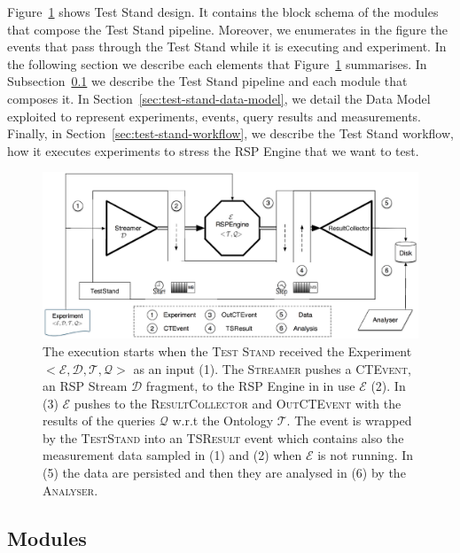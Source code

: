 Figure~\ref{fig:architecture} shows \name Test Stand design. It contains the block schema of the modules that compose the Test Stand pipeline. Moreover, we enumerates in the figure the events that pass through the Test Stand while it is executing and experiment. In the following section we describe each elements that Figure~\ref{fig:architecture} summarises. In Subsection~\ref{sec:modules} we describe the Test Stand pipeline and each module that composes it. In Section~\ref{sec:test-stand-data-model}, we detail the Data Model exploited to represent experiments, events, query results and measurements. Finally, in Section~\ref{sec:test-stand-workflow}, we describe the Test Stand workflow, how it executes experiments to stress the RSP Engine that we want to test.

\begin{figure}[tbh]
\centering
\includegraphics[scale=0.37]{images/heaven-schema-workflow}
\caption[\name Modules and Workflow]{The execution starts when the \textsc{Test Stand} received the Experiment $<\mathcal{E},\mathcal{D},\mathcal{T},\mathcal{Q}>$ as an input (1). The \textsc{Streamer} pushes a \textsc{CTEvent}, an RSP Stream $\mathcal{D}$ fragment, to the RSP Engine in in use $\mathcal{E}$ (2). In (3) $\mathcal{E}$ pushes to the \textsc{ResultCollector} and \textsc{OutCTEvent} with the results of the queries $\mathcal{Q}$ w.r.t the Ontology $\mathcal{T}$. The event is wrapped by the \textsc{TestStand} into an \textsc{TSResult} event which contains also the measurement data sampled in (1) and (2) when $\mathcal{E}$ is not running. In (5) the data are persisted and then they are analysed in (6) by the \textsc{Analyser}.}
\label{fig:architecture}
\end{figure}


\subsection{Modules}\label{sec:modules}

